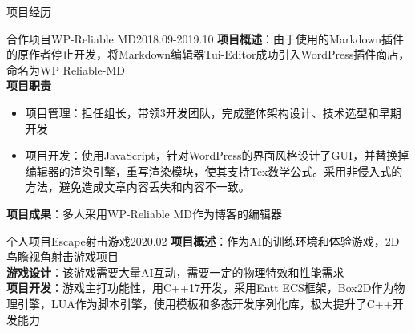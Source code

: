 \documentclass[UTF8]{resume}
\begin{document}
\begin{rSection}{项目经历}

    \begin{rProject}{合作项目}{WP-Reliable MD}{2018.09-2019.10}
        \textbf{项目概述}：由于使用的Markdown插件的原作者停止开发，将Markdown编辑器Tui-Editor成功引入WordPress插件商店，命名为WP Reliable-MD\\
        \textbf{项目职责}
        \begin{itemize}
            \itemsep -0.5em \vspace{-0.5em}
            \item 项目管理：担任组长，带领3开发团队，完成整体架构设计、技术选型和早期开发
            \item 项目开发：使用JavaScript，针对WordPress的界面风格设计了GUI，并替换掉编辑器的渲染引擎，重写渲染模块，使其支持Tex数学公式。采用非侵入式的方法，避免造成文章内容丢失和内容不一致。
        \end{itemize}
        \textbf{项目成果}：多人采用WP-Reliable MD作为博客的编辑器
    \end{rProject}

    \begin{rProject}{个人项目}{Escape射击游戏}{2020.02}
        \textbf{项目概述}：作为AI的训练环境和体验游戏，2D鸟瞻视角射击游戏项目\\
        \textbf{游戏设计}：该游戏需要大量AI互动，需要一定的物理特效和性能需求\\
        \textbf{项目开发}：游戏主打功能性，用C++17开发，采用Entt ECS框架，Box2D作为物理引擎，LUA作为脚本引擎，使用模板和多态开发序列化库，极大提升了C++开发能力
    \end{rProject}



\end{rSection}
\end{document}
